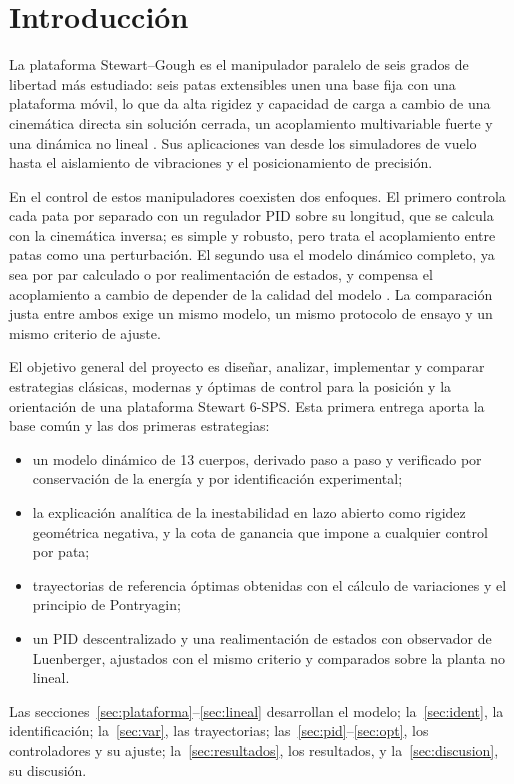 \documentclass[conference]{IEEEtran}
\begin{document}
\section{Introducción}

La plataforma Stewart--Gough es el manipulador paralelo de seis grados de libertad más estudiado: seis patas extensibles unen una base fija con una plataforma móvil, lo que da alta rigidez y capacidad de carga a cambio de una cinemática directa sin solución cerrada, un acoplamiento multivariable fuerte y una dinámica no lineal \cite{stewart1965,dasgupta2000,merlet2006}. Sus aplicaciones van desde los simuladores de vuelo hasta el aislamiento de vibraciones y el posicionamiento de precisión.

En el control de estos manipuladores coexisten dos enfoques. El primero controla cada pata por separado con un regulador PID sobre su longitud, que se calcula con la cinemática inversa; es simple y robusto, pero trata el acoplamiento entre patas como una perturbación. El segundo usa el modelo dinámico completo, ya sea por par calculado o por realimentación de estados, y compensa el acoplamiento a cambio de depender de la calidad del modelo \cite{dasgupta2000,merlet2006}. La comparación justa entre ambos exige un mismo modelo, un mismo protocolo de ensayo y un mismo criterio de ajuste.

El objetivo general del proyecto es diseñar, analizar, implementar y comparar estrategias clásicas, modernas y óptimas de control para la posición y la orientación de una plataforma Stewart 6-SPS. Esta primera entrega aporta la base común y las dos primeras estrategias:
\begin{itemize}
\item un modelo dinámico de 13 cuerpos, derivado paso a paso y verificado por conservación de la energía y por identificación experimental;
\item la explicación analítica de la inestabilidad en lazo abierto como rigidez geométrica negativa, y la cota de ganancia que impone a cualquier control por pata;
\item trayectorias de referencia óptimas obtenidas con el cálculo de variaciones y el principio de Pontryagin;
\item un PID descentralizado y una realimentación de estados con observador de Luenberger, ajustados con el mismo criterio y comparados sobre la planta no lineal.
\end{itemize}
Las secciones~\ref{sec:plataforma}--\ref{sec:lineal} desarrollan el modelo; la~\ref{sec:ident}, la identificación; la~\ref{sec:var}, las trayectorias; las~\ref{sec:pid}--\ref{sec:opt}, los controladores y su ajuste; la~\ref{sec:resultados}, los resultados, y la~\ref{sec:discusion}, su discusión.
\end{document}
